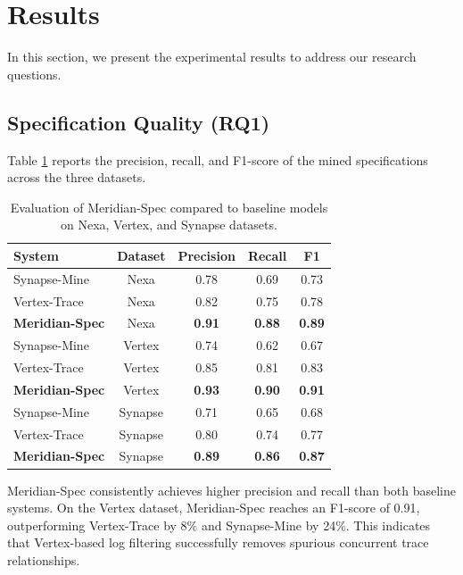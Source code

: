 \section{Results}
In this section, we present the experimental results to address our research questions.

\subsection{Specification Quality (RQ1)}
Table \ref{tab:evaluation} reports the precision, recall, and F1-score of the mined specifications across the three datasets.

\begin{table}[h]
  \caption{Evaluation of Meridian-Spec compared to baseline models on Nexa, Vertex, and Synapse datasets.}
  \label{tab:evaluation}
  \centering
  \small
  \begin{tabular}{l c c c c}
    \toprule
    \textbf{System} & \textbf{Dataset} & \textbf{Precision} & \textbf{Recall} & \textbf{F1} \\
    \midrule
    Synapse-Mine \cite{williams2021synapse} & Nexa & 0.78 & 0.69 & 0.73 \\
    Vertex-Trace \cite{zhang2023vertex} & Nexa & 0.82 & 0.75 & 0.78 \\
    \textbf{Meridian-Spec} & Nexa & \textbf{0.91} & \textbf{0.88} & \textbf{0.89} \\
    \midrule
    Synapse-Mine \cite{williams2021synapse} & Vertex & 0.74 & 0.62 & 0.67 \\
    Vertex-Trace \cite{zhang2023vertex} & Vertex & 0.85 & 0.81 & 0.83 \\
    \textbf{Meridian-Spec} & Vertex & \textbf{0.93} & \textbf{0.90} & \textbf{0.91} \\
    \midrule
    Synapse-Mine \cite{williams2021synapse} & Synapse & 0.71 & 0.65 & 0.68 \\
    Vertex-Trace \cite{zhang2023vertex} & Synapse & 0.80 & 0.74 & 0.77 \\
    \textbf{Meridian-Spec} & Synapse & \textbf{0.89} & \textbf{0.86} & \textbf{0.87} \\
    \bottomrule
  \end{tabular}
\end{table}

Meridian-Spec consistently achieves higher precision and recall than both baseline systems. On the Vertex dataset, Meridian-Spec reaches an F1-score of 0.91, outperforming Vertex-Trace by 8\% and Synapse-Mine by 24\%. This indicates that Vertex-based log filtering successfully removes spurious concurrent trace relationships.

